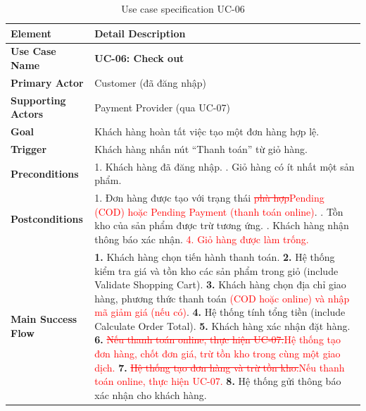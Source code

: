 \documentclass[12pt,a4paper,oneside]{report}
\newif\ifmark \marktrue
\newcommand{\chg}[1]{\ifmark\textcolor{red}{#1}\else #1\fi}
\newcommand{\del}[1]{\ifmark\textcolor{red}{\sout{#1}}\fi}
\begin{document}
\begin{longtable}{p{4cm}p{11.8cm}}
\caption{Use case specification UC-06}\\
\toprule
\textbf{Element} & \textbf{Detail Description} \\
\midrule
\endhead
\bottomrule
\endlastfoot
\textbf{Use Case Name} & \textbf{UC-06: Check out} \\
\textbf{Primary Actor} & Customer (đã đăng nhập) \\
\textbf{Supporting Actors} & Payment Provider (qua UC-07) \\
\textbf{Goal} & Khách hàng hoàn tất việc tạo một đơn hàng hợp lệ. \\
\textbf{Trigger} & Khách hàng nhấn nút ``Thanh toán'' từ giỏ hàng. \\
\textbf{Preconditions} & 1. Khách hàng đã đăng nhập. \newline 2. Giỏ hàng có ít nhất một sản phẩm. \\
\textbf{Postconditions} & 1. Đơn hàng được tạo với trạng thái \del{phù hợp}\chg{Pending (COD) hoặc Pending Payment (thanh toán online)}. \newline 2. Tồn kho của sản phẩm được trừ tương ứng. \newline 3. Khách hàng nhận thông báo xác nhận. \newline \chg{4. Giỏ hàng được làm trống.} \\
\textbf{Main Success Flow} & \textbf{1.} Khách hàng chọn tiến hành thanh toán. \newline \textbf{2.} Hệ thống kiểm tra giá và tồn kho các sản phẩm trong giỏ (include Validate Shopping Cart). \newline \textbf{3.} Khách hàng chọn địa chỉ giao hàng, phương thức thanh toán\chg{ (COD hoặc online) và nhập mã giảm giá (nếu có)}. \newline \textbf{4.} Hệ thống tính tổng tiền (include Calculate Order Total). \newline \textbf{5.} Khách hàng xác nhận đặt hàng. \newline \textbf{6.} \del{Nếu thanh toán online, thực hiện UC-07.}\chg{Hệ thống tạo đơn hàng, chốt đơn giá, trừ tồn kho trong cùng một giao dịch.} \newline \textbf{7.} \del{Hệ thống tạo đơn hàng và trừ tồn kho.}\chg{Nếu thanh toán online, thực hiện UC-07.} \newline \textbf{8.} Hệ thống gửi thông báo xác nhận cho khách hàng. \\

\end{longtable}
\end{document}
